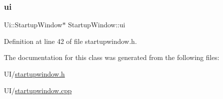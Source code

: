 \subsubsection{\texorpdfstring{ui}{ui}}
{\footnotesize\ttfamily Ui\+::\+Startup\+Window$\ast$ Startup\+Window\+::ui\hspace{0.3cm}{\ttfamily [private]}}



Definition at line 42 of file startupwindow.\+h.



The documentation for this class was generated from the following files\+:\begin{DoxyCompactItemize}
\item 
U\+I/\mbox{\hyperlink{startupwindow_8h}{startupwindow.\+h}}\item 
U\+I/\mbox{\hyperlink{startupwindow_8cpp}{startupwindow.\+cpp}}\end{DoxyCompactItemize}
